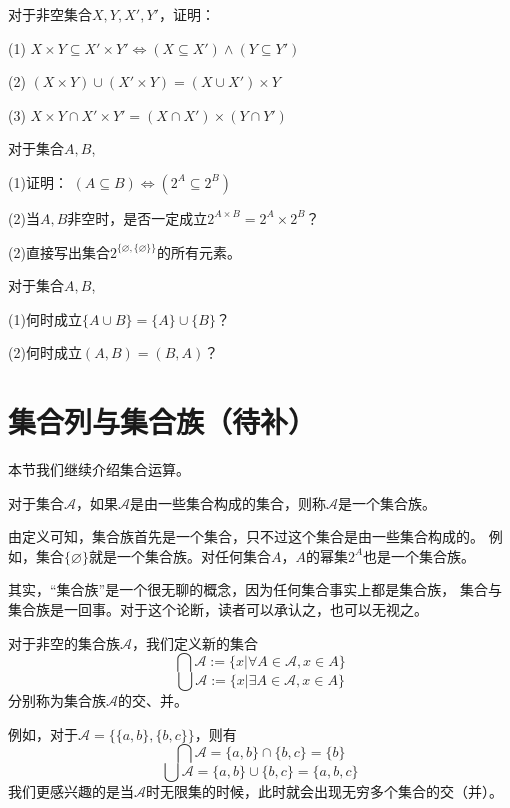 \begin{prob}对于非空集合$X,Y,X',Y'$，证明：

(1) $X\times Y\subseteq X'\times Y' \Leftrightarrow (X\subseteq X')\wedge(Y\subseteq Y')$

(2) $(X\times Y)\cup(X'\times Y)=(X\cup X')\times Y$

(3) $X\times Y\cap X'\times Y'=(X\cap X')\times(Y\cap Y')$
\end{prob}\vs

\begin{prob} 对于集合$A,B$,

(1)证明： $(A\subseteq B)\Leftrightarrow (2^A\subseteq 2^B)$

(2)当$A,B$非空时，是否一定成立$2^{A\times B}=2^A\times2^B$？

(2)直接写出集合$2^{\{\varnothing,\{\varnothing\}\}}$的所有元素。

\end{prob}\vs

\begin{prob}对于集合$A,B$,

(1)何时成立$\{A\cup B\}=\{A\}\cup\{B\}$？

(2)何时成立$(A,B)=(B,A)$？
\end{prob}\vs

\section{集合列与集合族（待补）}
本节我们继续介绍集合运算。
\begin{definition}[集合族]
对于集合$\mathcal{A}$，如果$\mathcal{A}$是由一些集合构成的集合，则称$\mathcal{A}$是一个集合族。
\end{definition}
由定义可知，集合族首先是一个集合，只不过这个集合是由一些集合构成的。
例如，集合$\{\varnothing\}$就是一个集合族。对任何集合$A$，$A$的幂集$2^A$也是一个集合族。

其实，“集合族”是一个很无聊的概念，因为任何集合事实上都是集合族，
集合与集合族是一回事。对于这个论断，读者可以承认之，也可以无视之。

\begin{definition}[任意交与任意并]
对于非空的集合族$\mathcal{A}$，我们定义新的集合
$$\bigcap \mathcal{A}:=\{x|\forall A\in \mathcal{A},x\in A\}$$
$$\bigcup \mathcal{A}:=\{x|\exists A\in \mathcal{A},x\in A\}$$
分别称为集合族$\mathcal{A}$的交、并。
\end{definition}
例如，对于$\mathcal{A}=\{\{a,b\},\{b,c\}\}$，则有
$$\bigcap \mathcal{A}=\{a,b\}\cap\{b,c\}=\{b\}$$
$$\bigcup \mathcal{A}=\{a,b\}\cup\{b,c\}=\{a,b,c\}$$
我们更感兴趣的是当$\mathcal{A}$时无限集的时候，此时就会出现无穷多个集合的交（并）。\vs

